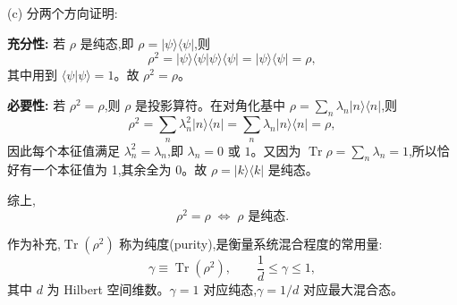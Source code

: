 \begin{question}
\begin{solution}
(c) 分两个方向证明:

\textbf{充分性:} 若 $\rho$ 是纯态,即 $\rho = |\psi\rangle\langle\psi|$,则
\[
\rho^2 = |\psi\rangle\langle\psi|\psi\rangle\langle\psi| = |\psi\rangle\langle\psi| = \rho,
\]
其中用到 $\langle\psi|\psi\rangle=1$。故 $\rho^2 = \rho$。

\textbf{必要性:} 若 $\rho^2 = \rho$,则 $\rho$ 是投影算符。在对角化基中 $\rho = \sum_n \lambda_n |n\rangle\langle n|$,则
\[
\rho^2 = \sum_n \lambda_n^2 |n\rangle\langle n| = \sum_n \lambda_n |n\rangle\langle n| = \rho,
\]
因此每个本征值满足 $\lambda_n^2 = \lambda_n$,即 $\lambda_n = 0$ 或 $1$。又因为 $\operatorname{Tr}\rho = \sum_n \lambda_n = 1$,所以恰好有一个本征值为 1,其余全为 0。故 $\rho = |k\rangle\langle k|$ 是纯态。

综上,
\[
\boxed{\rho^2 = \rho \;\Longleftrightarrow\; \rho \text{ 是纯态}.}
\]

作为补充,$\operatorname{Tr}(\rho^2)$ 称为纯度(purity),是衡量系统混合程度的常用量:
\[
\gamma \equiv \operatorname{Tr}(\rho^2),\qquad \frac{1}{d} \le \gamma \le 1,
\]
其中 $d$ 为 Hilbert 空间维数。$\gamma=1$ 对应纯态,$\gamma=1/d$ 对应最大混合态。
\end{solution}
\end{question}

